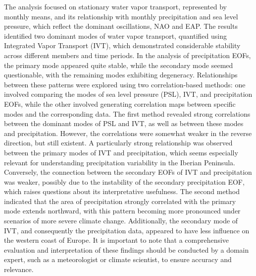 The analysis focused on stationary water vapor transport, represented by monthly means, and its relationship with monthly precipitation and sea level pressure, which reflect the dominant oscillations, NAO and EAP. 
The results identified two dominant modes of water vapor transport, quantified using Integrated Vapor Transport (IVT), which demonstrated considerable stability across different members and time periods.
In the analysis of precipitation EOFs, the primary mode appeared quite stable, while the secondary mode seemed questionable, with the remaining modes exhibiting degeneracy. 
Relationships between these patterns were explored using two correlation-based methods: one involved comparing the modes of sea level pressure (PSL), IVT, and precipitation EOFs, while the other involved generating correlation maps between specific modes and the corresponding data.
The first method revealed strong correlations between the dominant modes of PSL and IVT, as well as between these modes and precipitation. 
However, the correlations were somewhat weaker in the reverse direction, but still existent. 
A particularly strong relationship was observed between the primary modes of IVT and precipitation, which seems especially relevant for understanding precipitation variability in the Iberian Peninsula. 
Conversely, the connection between the secondary EOFs of IVT and precipitation was weaker, possibly due to the instability of the secondary precipitation EOF, which raises questions about its interpretative usefulness.
The second method indicated that the area of precipitation strongly correlated with the primary mode extends northward, with this pattern becoming more pronounced under scenarios of more severe climate change. 
Additionally, the secondary mode of IVT, and consequently the precipitation data, appeared to have less influence on the western coast of Europe.
It is important to note that a comprehensive evaluation and interpretation of these findings should be conducted by a domain expert, such as a meteorologist or climate scientist, to ensure accuracy and relevance.

